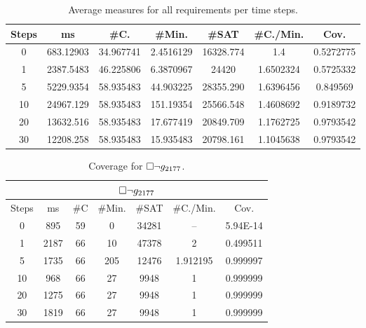 {\begin{table}[!t]
\centering
\caption{Average measures for all requirements per time steps.}
{
\begin{tabular}{|c|c|c|c|c|c|c|}
\hline
Steps & ms &  \#C. & \#Min. & \#SAT & \#C./Min. & Cov.\\
\hline
0 & 683.12903 & 34.967741 & 2.4516129 & 16328.774 & 1.4 & 0.5272775\\
1 & 2387.5483 & 46.225806 & 6.3870967 & 24420 & 1.6502324 & 0.5725332\\
5 & 5229.9354 & 58.935483 & 44.903225 & 28355.290 & 1.6396456 & 0.849569\\
10 & 24967.129 & 58.935483 & 151.19354 & 25566.548 & 1.4608692 & 0.9189732\\
20 & 13632.516 & 58.935483 & 17.677419 & 20849.709 & 1.1762725 & 0.9793542\\
30 & 12208.258 & 58.935483 & 15.935483 & 20798.161 & 1.1045638 & 0.9793542\\
\hline
\end{tabular}}
\end{table}
\begin{table}[!t]
\label{tab:pdt}
\centering
\caption{Coverage for ${{\square}} \lnot g_{2177}$.}
{
\begin{tabular}{|c|c|c|c|c|c|c|}
\hline
\multicolumn{7}{|c|}{${{\square}} \lnot g_{2177}$} \\
\hline
Steps & ms & \#C & \#Min. & \#SAT & \#C./Min. & Cov.\\
\hline
0 & 895 & 59 & 0 & 34281 & -- & 5.94E-14\\
1 & 2187 & 66 & 10 & 47378 & 2 & 0.499511\\
5 & 1735 & 66 & 205 & 12476 & 1.912195 & 0.999997\\
10 & 968 & 66 & 27 & 9948 & 1 & 0.999999\\
20 & 1275 & 66 & 27 & 9948 & 1 & 0.999999\\
30 & 1819 & 66 & 27 & 9948 & 1 & 0.999999\\
 \hline
\end{tabular}
}
\label{tab:pdt2324}
\end{table}

}
